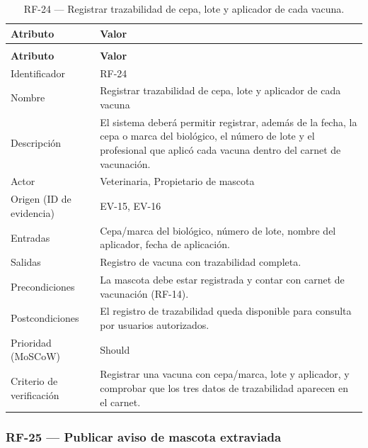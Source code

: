 \documentclass[journal,onecolumn]{IEEEtran}
\makeatletter
\newenvironment{atributos}[2]{%
	\small
	\begin{longtable}{@{}>{\raggedright\arraybackslash}p{4.2cm} >{\raggedright\arraybackslash}p{11.2cm}@{}}
		\caption{#2}\label{tab:#1}\\
		\toprule
		\textbf{Atributo} & \textbf{Valor} \\
		\midrule
		\endfirsthead
		\multicolumn{2}{@{}l}{\small\itshape (continuación)}\\
		\toprule
		\textbf{Atributo} & \textbf{Valor} \\
		\midrule
		\endhead
		\bottomrule
		\endlastfoot
	}{%
	\end{longtable}
	\normalsize
}
\makeatother
\begin{document}
	\begin{atributos}{RF-24}{RF-24 --- Registrar trazabilidad de cepa, lote y aplicador de cada vacuna.}
		Identificador & RF-24 \\
		Nombre & Registrar trazabilidad de cepa, lote y aplicador de cada vacuna \\
		Descripción & El sistema deberá permitir registrar, además de la fecha, la cepa o marca del biológico, el número de lote y el profesional que aplicó cada vacuna dentro del carnet de vacunación. \\
		Actor & Veterinaria, Propietario de mascota \\
		Origen (ID de evidencia) & EV-15, EV-16 \\
		Entradas & Cepa/marca del biológico, número de lote, nombre del aplicador, fecha de aplicación. \\
		Salidas & Registro de vacuna con trazabilidad completa. \\
		Precondiciones & La mascota debe estar registrada y contar con carnet de vacunación (RF-14). \\
		Postcondiciones & El registro de trazabilidad queda disponible para consulta por usuarios autorizados. \\
		Prioridad (MoSCoW) & Should \\
		Criterio de verificación & Registrar una vacuna con cepa/marca, lote y aplicador, y comprobar que los tres datos de trazabilidad aparecen en el carnet. \\
	\end{atributos}
	
	\subsubsection{RF-25 --- Publicar aviso de mascota extraviada}
	
\end{document}
